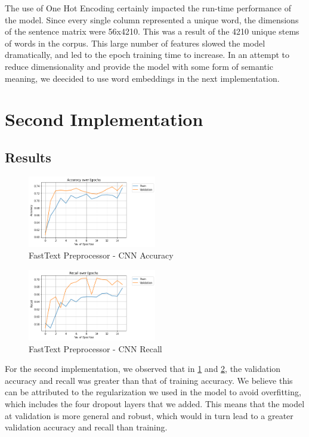 \documentclass[12pt]{report}
\begin{document}
The use of One Hot Encoding certainly impacted the run-time performance of the model.
Since every single column represented a unique word, the dimensions of the sentence matrix
were 56x4210. This was a result of the 4210 unique stems of words in the corpus. This large
number of features slowed the model dramatically, and led to the epoch training time to increase.
In an attempt to reduce dimensionality and provide the model with some form of semantic
meaning, we deecided to use word embeddings in the next implementation.

\section{Second Implementation}

\subsection{Results}

\begin{figure}[h!]
	\centering
	\includegraphics[width=0.5\textwidth]{accuracy-1.png}
	\caption{FastText Preprocessor - CNN Accuracy}
	\label{fig:ft-acc}
\end{figure}

\begin{figure}[h!]
	\centering
	\includegraphics[width=0.5\textwidth]{recall-1.png}
	\caption{FastText Preprocessor - CNN Recall}
	\label{fig:ft-rec}
\end{figure}

For the second implementation, we observed that in \ref{fig:ft-acc} and
\ref{fig:ft-rec}, the validation accuracy and
recall was greater than that of training accuracy. We believe this can be
attributed to the regularization we used in the model to avoid overfitting,
which includes the four dropout layers that we added. This means that the model
at validation is more general and robust, which would in turn lead to a greater
validation accuracy and recall than training.
\end{document}
